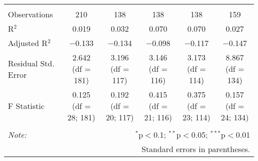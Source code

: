 \begin{tabular}{@{\extracolsep{5pt}}lccccc}
\hline \\[-1.8ex] 
Observations & 210 & 138 & 138 & 138 & 159 \\ 
R$^{2}$ & 0.019 & 0.032 & 0.070 & 0.070 & 0.027 \\ 
Adjusted R$^{2}$ & $-$0.133 & $-$0.134 & $-$0.098 & $-$0.117 & $-$0.147 \\ 
Residual Std. Error & 2.642 (df = 181) & 3.196 (df = 117) & 3.146 (df = 116) & 3.173 (df = 114) & 8.867 (df = 134) \\ 
F Statistic & 0.125 (df = 28; 181) & 0.192 (df = 20; 117) & 0.415 (df = 21; 116) & 0.375 (df = 23; 114) & 0.157 (df = 24; 134) \\ 
\hline 
\hline \\[-1.8ex] 
\textit{Note:}  & \multicolumn{5}{r}{$^{*}$p$<$0.1; $^{**}$p$<$0.05; $^{***}$p$<$0.01} \\ 
 & \multicolumn{5}{r}{Standard errors in parentheses.} \\ 
\end{tabular} 
\endgroup 
